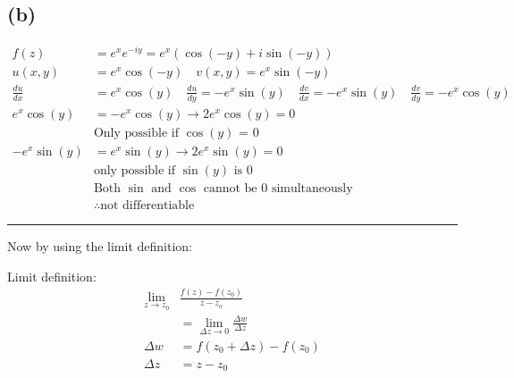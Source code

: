 \documentclass{article}
\newcommand{\der}[2]{\frac{d#1}{d#2}}
\begin{document}
\subsection*{(b)}
\begin{align*}
  f(z) &= e^{x}e^{-iy} = e^{x}(\cos{(-y)} + i\sin{(-y)}) \\
  u(x,y) &= e^{x}\cos{(-y)} \quad v(x,y) =e^{x}\sin{(-y)}\\
  \der{u}{x} &= e^{x}\cos{(y)} \quad \der{u}{y}= -e^{x}\sin{(y)} \quad  \der{v}{x} = -e^{x}\sin{(y)} \quad \der{v}{y} = -e^{x}\cos{(y)}\\
  e^{x}\cos{(y)} &= -e^{x}\cos{(y)} \to 2e^{x}\cos{(y)} = 0\\
  &\text{Only possible if $\cos{(y)}$ = 0} \\
  -e^{x}\sin{(y)} & = e^{x}\sin{(y)}  \to  2e^{x}\sin{(y)} = 0\\
       &\text{only possible if $\sin{(y)}$ is 0} \\
  &\text{Both $\sin$ and $\cos$ cannot be 0 simultaneously} \\
       &\therefore \text{not differentiable}
\end{align*}

\hrule
\vspace{.5cm} %
\newpage
Now by using the limit definition:

Limit definition:
\begin{align*}
  \lim\limits_{z \to z_0}&\frac{f(z)-f(z_0)}{z-z_o}\\
  &= \lim\limits_{\Delta z \to 0} \frac{\Delta w}{\Delta z}\\
  \Delta w &= f(z_0 + \Delta z) - f(z_0) \\
  \Delta z &= z - z_0\\
\end{align*}
\end{document}
